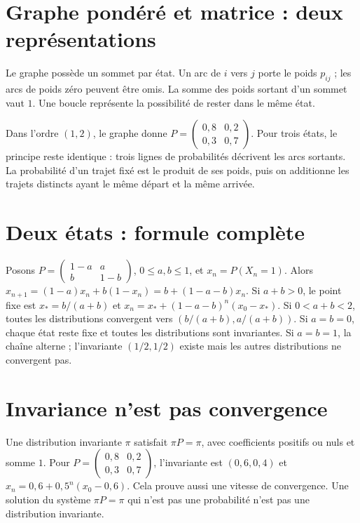 \documentclass[../cours_tle.tex]{subfiles}
\begin{document}
\section{Graphe pondéré et matrice : deux représentations}
Le graphe possède un sommet par état. Un arc de $i$ vers $j$ porte le poids $p_{ij}$ ; les arcs de poids zéro peuvent être omis. La somme des poids sortant d'un sommet vaut $1$. Une boucle représente la possibilité de rester dans le même état.
\begin{center}
\end{center}
Dans l'ordre $(1,2)$, le graphe donne $P=\begin{pmatrix}0{,}8&0{,}2\\0{,}3&0{,}7\end{pmatrix}$. Pour trois états, le principe reste identique : trois lignes de probabilités décrivent les arcs sortants. La probabilité d'un trajet fixé est le produit de ses poids, puis on additionne les trajets distincts ayant le même départ et la même arrivée.
\section{Deux états : formule complète}
Posons $P=\begin{pmatrix}1-a&a\\b&1-b\end{pmatrix}$, $0\le a,b\le1$, et $x_n=P(X_n=1)$.
Alors $x_{n+1}=(1-a)x_n+b(1-x_n)=b+(1-a-b)x_n$.
Si $a+b>0$, le point fixe est $x_*=b/(a+b)$ et
$x_n=x_*+(1-a-b)^n(x_0-x_*)$.
Si $0<a+b<2$, toutes les distributions convergent vers $(b/(a+b),a/(a+b))$.
Si $a=b=0$, chaque état reste fixe et toutes les distributions sont invariantes.
Si $a=b=1$, la chaîne alterne ; l'invariante $(1/2,1/2)$ existe mais les autres distributions ne convergent pas.
\section{Invariance n'est pas convergence}
Une distribution invariante $\pi$ satisfait $\pi P=\pi$, avec coefficients positifs ou nuls et somme $1$.
Pour $P=\begin{pmatrix}0{,}8&0{,}2\\0{,}3&0{,}7\end{pmatrix}$, l'invariante est $(0{,}6,0{,}4)$ et
$x_n=0{,}6+0{,}5^n(x_0-0{,}6)$. Cela prouve aussi une vitesse de convergence.
Une solution du système $\pi P=\pi$ qui n'est pas une probabilité n'est pas une distribution invariante.
\end{document}
